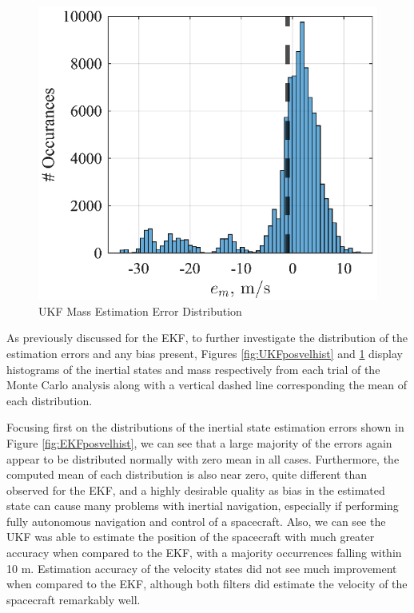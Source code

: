 \documentclass[letterpaper, paper,11pt]{AAS}		%
\begin{document}
\begin{figure}
	\centering 
	\includegraphics{./../../figures/UKFMassHist.eps}
	\caption{UKF Mass Estimation Error Distribution}
	\label{fig:UKFmasshist}
\end{figure}

As previously discussed for the EKF, to further investigate the distribution of the estimation errors and any bias present, Figures \ref{fig:UKFposvelhist} and \ref{fig:UKFmasshist} display histograms of the inertial states and mass respectively from each trial of the Monte Carlo analysis along with a vertical dashed line corresponding the mean of each distribution. 

Focusing first on the distributions of the inertial state estimation errors shown in Figure \ref{fig:EKFposvelhist}, we can see that a large majority of the errors again appear to be distributed normally with zero mean in all cases. Furthermore, the computed mean of each distribution is also near zero, quite different than observed for the EKF, and a highly desirable quality as bias in the estimated state can cause many problems with inertial navigation, especially if performing fully autonomous navigation and control of a spacecraft. Also, we can see the UKF was able to estimate the position of the spacecraft with much greater accuracy when compared to the EKF, with a majority occurrences falling within 10 m. Estimation accuracy of the velocity states did not see much improvement when compared to the EKF, although both filters did estimate the velocity of the spacecraft remarkably well. 
\end{document}
